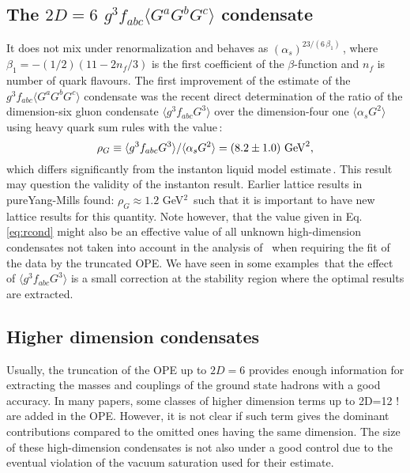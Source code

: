 \documentclass[aps,prd,groupedaddress,nofootinbib]{revtex4-1}
\def\beq{\begin{equation}}
\def\eeq{\end{equation}}
\def\la{\langle}
\def\ra{\rangle}
\begin{document}
\subsection{The $2D=6$ $g^3f_{abc}\la G^aG^bG^c \ra$ condensate}
 It does not mix under renormalization and behaves as $(\alpha_s)^{23/(6\,\beta_1)}$\,\cite{SNTARRACH}, where $\beta_1=-(1/2)(11-2n_f/3)$ is the first coefficient of the $\beta$-function and $n_f$ is number of quark flavours. 
The first improvement of the estimate of the $g^3f_{abc}\la G^aG^bG^c \ra$ condensate was the recent direct determination of 
the ratio of the dimension-six gluon condensate $\la g^3f_{abc} G^3\ra$ over the dimension-four one $\la\alpha_s G^2\ra$ using heavy quark sum rules with the value\,\cite{SNcb1}:
\vspace*{-0.15cm}
\beq
\rho_G\equiv \la g^3f_{abc} G^3\ra/ \la \alpha_s G^2\ra=(8.2\pm 1.0)~{\rm GeV}^2,
\label{eq:rcond}
\eeq
\vspace*{-0.15cm}
which differs significantly from the instanton liquid model estimate\,\cite{NIKOL2,SHURYAK,IOFFE2}. This result may question the validity of the instanton result. 
Earlier lattice results in pureYang-Mills found:  $\rho_G\approx 1.2$ GeV$^2$\,\cite{GIACO} such that it is important to have new lattice results for  this quantity. Note however, that the value given in Eq.\,\ref{eq:rcond} might also be an effective value of all unknown high-dimension condensates not taken into account in the analysis of \,\cite{SNcb1} when requiring the fit of the data by the truncated OPE.  We have seen  in some examples\,\cite{SNREV21,SNREV22} that the effect of  $ \la g^3f_{abc} G^3\ra$ is a small correction at the stability  region where the optimal results are extracted.  
 
\subsection{Higher dimension condensates}
 Usually, the truncation of the OPE up to $2D=6$ provides enough information for extracting the masses and couplings of the ground state hadrons with a good accuracy. In many papers, some classes of higher dimension terms up to 2D=12 !  are added in the OPE. However, it is not clear if such  term gives the dominant contributions compared to the omitted ones having the same dimension.  The size of these high-dimension condensates is not also under a good control due to the eventual violation of the vacuum saturation used for their estimate. 
\end{document}
